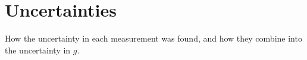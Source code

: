 \section{Uncertainties}
\label{sec:appendix}
How the uncertainty in each measurement was found, and how they combine into
the uncertainty in $g$.
